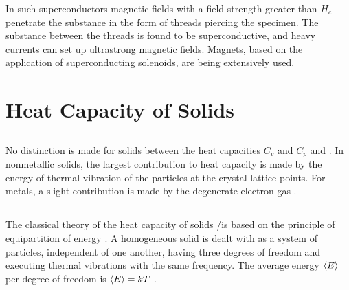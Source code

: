 In such superconductors magnetic fields with a field strength
greater than $H_{c}$  penetrate the substance in the form of threads piercing the specimen. The substance between the threads is found to be superconductive, and heavy currents can set up ultrastrong magnetic fields. Magnets, based on the application of superconducting solenoids, are being extensively used.

\section{Heat Capacity of Solids}
\label{sec-41.7} 


\subsection{}\label{41.7.1} No distinction is made for solids between the heat capacities $C_{v}$ and $C_{p}$  and . In nonmetallic solids, the largest contribution to heat capacity is made by the energy of thermal vibration of the particles at the crystal lattice points. For metals, a slight contribution is made by the degenerate electron gas . 

\subsection{}\label{41.7.2} The classical theory of the heat capacity of solids /is based on the principle of equipartition of energy . A homogeneous solid is dealt with as a system of particles, independent of one another, having three degrees of freedom and executing thermal vibrations with the same frequency. The
average energy $\expval{E}$ per degree of freedom is $\expval{E} = kT$ . 

